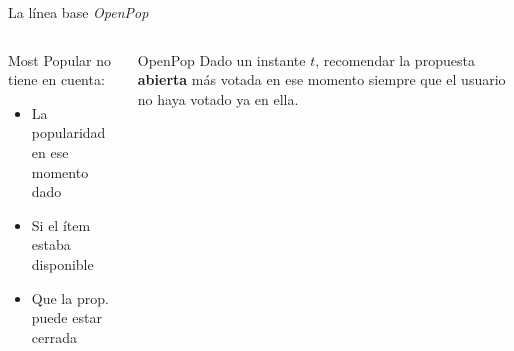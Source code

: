 \begin{frame}{La línea base \textit{OpenPop}}
\begin{columns}
    \begin{alertblock}{Most Popular no tiene en cuenta:}
    \begin{itemize}
        \item La popularidad en ese momento dado
        \item Si el ítem estaba disponible
        \item Que la prop. puede estar cerrada
    \end{itemize}
    \end{alertblock}
    \pause
    \begin{exampleblock}{OpenPop}
        Dado un instante $t$, recomendar la propuesta \textbf{abierta} más votada en ese momento siempre que el usuario no haya votado ya en ella.
    \end{exampleblock}
\end{columns}

\end{frame}
